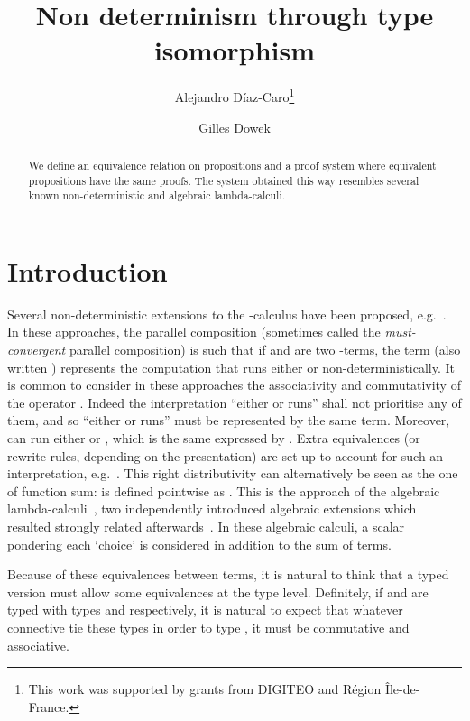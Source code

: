 \documentclass[final,copyright,creativecommons]{eptcs}
\title{Non determinism through type isomorphism}
\author{Alejandro D\'iaz-Caro\thanks{This work was supported by grants from DIGITEO and R\'egion \^Ile-de-France.}
\institute{Universit\'e Paris 13, Sorbonne Paris Cit\'e, LIPN\\
Universit\'e Paris-Ouest Nanterre La D\'efense\\
INRIA}
\and Gilles Dowek
\institute{INRIA\\
23 avenue d'Italie, CS 81321,\\ 75214 Paris Cedex 13}
}
\theoremstyle{definition}
\begin{document}
\maketitle

\begin{abstract}
We define an equivalence relation on propositions and a proof system
where equivalent propositions have the same proofs.  The system
obtained this way resembles several known non-deterministic and
algebraic lambda-calculi.
\end{abstract}

\section{Introduction}
Several non-deterministic extensions to the -calculus have been proposed,
e.g.~\cite{BoudolIC94,BucciarelliEhrhardManzonettoAPAL12,deLiguoroPipernoIC95,DezaniciancaglinideliguoroPipernoTCS96,DezaniciancagliniDeliguoroPipernoSIAM98,PaganiRonchidellaroccaFI10}. In these approaches, the parallel composition (sometimes called the
{\em must-convergent} parallel composition)
is such that if  and  are two -terms, the term  (also written ) represents the computation that runs either  or  non-deterministically.
It is common to consider in these approaches the associativity and commutativity of the operator . Indeed the interpretation ``either  or  runs'' shall not prioritise any of them, and so ``either  or  runs'' must be represented by the same term. Moreover,  can run either  or , which is the same expressed by . Extra equivalences (or rewrite rules, depending on the presentation) are set up to account for such an interpretation, e.g.~. This right distributivity can alternatively be seen as the one of function sum:  is defined pointwise as . This is the approach of the algebraic lambda-calculi~\cite{ArrighiDowekRTA08,VauxMSCS09}, two independently introduced algebraic extensions which resulted strongly related afterwards~\cite{AssafPerdrixDCM11,DiazcaroPerdrixTassonValironHOR10}. In these algebraic calculi, a scalar pondering each `choice' is considered in addition to the sum of terms.

Because of these equivalences between terms, it is natural to think that a typed version must allow some equivalences at the type level. Definitely, if  and  are typed with types  and  respectively, it is natural to expect that whatever connective tie these types in order to type , it must be commutative and associative.
\end{document}
